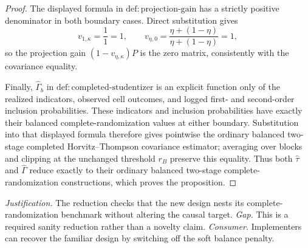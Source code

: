 \documentclass{article}
\begin{document}
\begin{proof}
The displayed formula in \(\mathrm{def:projection\mbox{-}gain}\) has a strictly positive denominator in both boundary cases.  Direct substitution gives
\[
 v_{1,\kappa}=\frac{1}{1}=1,
 \qquad
 v_{\eta,0}
 =\frac{\eta+(1-\eta)}{\eta+(1-\eta)}=1,
\]
so the projection gain \((1-v_{\eta,\kappa})P\) is the zero matrix, consistently with the covariance equality.

Finally, \(\widehat\Gamma_b\) in \(\mathrm{def:completed\mbox{-}studentizer}\) is an explicit function only of the realized indicators, observed cell outcomes, and logged first- and second-order inclusion probabilities.  These indicators and inclusion probabilities have exactly their balanced complete-randomization values at either boundary.  Substitution into that displayed formula therefore gives pointwise the ordinary balanced two-stage completed Horvitz--Thompson covariance estimator; averaging over blocks and clipping at the unchanged threshold \(r_B\) preserve this equality.  Thus both \(\widehat\tau\) and \(\widehat\Gamma\) reduce exactly to their ordinary balanced two-stage complete-randomization constructions, which proves the proposition.
\end{proof}
\par\smallskip\noindent \textit{Justification.} The reduction checks that the new design nests its complete-randomization benchmark without altering the causal target. \textit{Gap.} This is a required sanity reduction rather than a novelty claim. \textit{Consumer.} Implementers can recover the familiar design by switching off the soft balance penalty.
\end{document}
